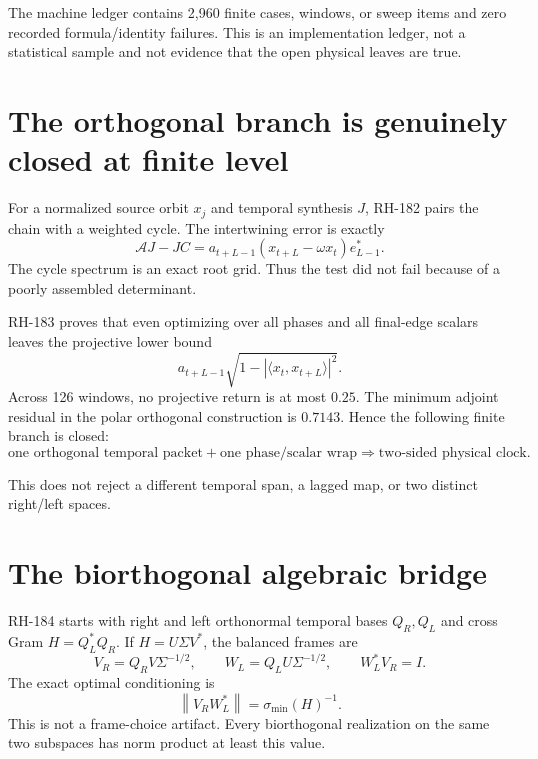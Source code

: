 \documentclass[12pt]{article}
\theoremstyle{remark}
\newcommand{\norm}[1]{\left\lVert#1\right\rVert}
\begin{document}
The machine ledger contains 2,960 finite cases, windows, or sweep items and
zero recorded formula/identity failures.  This is an implementation ledger,
not a statistical sample and not evidence that the open physical leaves are
true.

\section{The orthogonal branch is genuinely closed at finite level}

For a normalized source orbit $x_j$ and temporal synthesis $J$, RH-182 pairs
the chain with a weighted cycle.  The intertwining error is exactly
\begin{equation}\label{eq:rank-one}
 \mathcal AJ-JC
 =a_{t+L-1}(x_{t+L}-\omega x_t)e_{L-1}^*.
\end{equation}
The cycle spectrum is an exact root grid.  Thus the test did not fail because
of a poorly assembled determinant.

RH-183 proves that even optimizing over all phases and all final-edge
scalars leaves the projective lower bound
\begin{equation}\label{eq:projective}
 a_{t+L-1}\sqrt{1-|\langle x_t,x_{t+L}\rangle|^2}.
\end{equation}
Across 126 windows, no projective return is at most $0.25$.  The minimum
adjoint residual in the polar orthogonal construction is $0.7143$.  Hence
the following finite branch is closed:
\begin{equation}\label{eq:closed-orthogonal}
 \text{one orthogonal temporal packet}
 +\text{one phase/scalar wrap}
 \Longrightarrow\text{two-sided physical clock}.
\end{equation}

This does not reject a different temporal span, a lagged map, or two distinct
right/left spaces.

\section{The biorthogonal algebraic bridge}

RH-184 starts with right and left orthonormal temporal bases $Q_R,Q_L$ and
cross Gram $H=Q_L^*Q_R$.  If
$H=U\Sigma V^*$, the balanced frames are
\begin{equation}\label{eq:balanced}
 V_R=Q_RV\Sigma^{-1/2},
 \qquad W_L=Q_LU\Sigma^{-1/2},
 \qquad W_L^*V_R=I.
\end{equation}
The exact optimal conditioning is
\begin{equation}\label{eq:optimal-conditioning}
 \norm{V_RW_L^*}=\sigma_{\min}(H)^{-1}.
\end{equation}
This is not a frame-choice artifact.  Every biorthogonal realization on the
same two subspaces has norm product at least this value.
\end{document}
